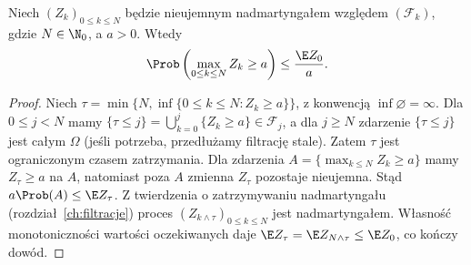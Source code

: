\begin{lemat}
\label{lem:rp1-15-supermart-max}
Niech $(Z_k)_{0\leq k\leq N}$ będzie
nieujemnym nadmartyngałem względem $(\mathcal F_k)$,
gdzie $N\in\N_0$, a $a>0$. Wtedy
\[
\Prob\left(\max_{0\leq k\leq N}Z_k\geq a\right)
\leq\frac{\E Z_0}{a}.
\]
\end{lemat}
\begin{proof}
Niech $\tau=\min\{N,\inf\{0\leq k\leq N:Z_k\geq a\}\}$,
z konwencją $\inf\varnothing=\infty$.
Dla $0\leq j<N$ mamy
$\{\tau\leq j\}=\bigcup_{k=0}^j\{Z_k\geq a\}\in\mathcal F_j$,
a dla $j\geq N$ zdarzenie $\{\tau\leq j\}$ jest całym
$\Omega$ (jeśli potrzeba, przedłużamy filtrację stale).
Zatem $\tau$ jest ograniczonym czasem zatrzymania.
Dla zdarzenia $A=\{\max_{k\leq N}Z_k\geq a\}$
mamy $Z_\tau\geq a$ na $A$, natomiast poza $A$
zmienna $Z_\tau$ pozostaje nieujemna.
Stąd $a\Prob(A)\leq\E Z_\tau$.
Z twierdzenia o zatrzymywaniu nadmartyngału
(rozdział~\ref{ch:filtracje}) proces
$(Z_{k\wedge\tau})_{0\leq k\leq N}$ jest nadmartyngałem.
Własność monotoniczności wartości oczekiwanych
daje $\E Z_\tau=\E Z_{N\wedge\tau}\leq\E Z_0$,
co kończy dowód.
\end{proof}

